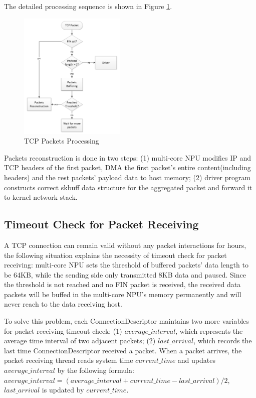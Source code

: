 \documentclass[conference]{IEEEtran}
\begin{document}
The detailed processing sequence is shown in Figure \ref{tcp packets processing}.
\begin{figure}[!t]
\centering
\includegraphics[width=2.0in]{tcp_packets_processing}
\caption{TCP Packets Processing}
\label{tcp packets processing}
\end{figure}
Packets reconstruction is done in two steps: (1) multi-core NPU modifies IP and TCP headers of the first packet, DMA the first packet's entire content(including headers) and the rest packets' payload data to host memory; (2) driver program constructs correct skbuff data structure for the aggregated packet and forward it to kernel network stack.
\subsection{Timeout Check for Packet Receiving}
A TCP connection can remain valid without any packet interactions for hours, the following situation explains the necessity of timeout check for packet receiving: multi-core NPU sets the threshold of buffered packets' data length to be 64KB, while the sending side only transmitted 8KB data and paused. Since the threshold is not reached and no FIN packet is received, the received data packets will be buffed in the multi-core NPU's memory permanently and will never reach to the data receiving host.

To solve this problem, each ConnectionDescriptor maintains two more variables for packet receiving timeout check: (1) $average\_interval$, which represents the average time interval of two adjacent packets; (2) $last\_arrival$, which records the last time ConnectionDescriptor received a packet. When a packet arrives, the packet receiving thread reads system time $current\_time$ and updates $average\_interval$ by the following formula: $average\_interval = (average\_interval + current\_time - last\_arrival) / 2$, $last\_arrival$ is updated by $current\_time$.
\end{document}
